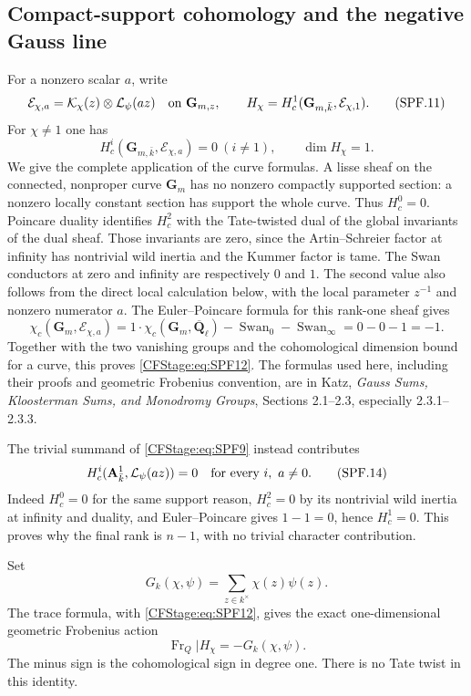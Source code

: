 \subsection{Compact-support cohomology and the negative Gauss line}

For a nonzero scalar \(a\), write
\[
 \mathcal E_{\chi,a}=
       \mathcal K_\chi(z)\otimes\mathcal L_\psi(az)
       \quad\hbox{on }\mathbf G_{m,z},\qquad
 H_\chi=H_c^1(\mathbf G_{m,\bar k},\mathcal E_{\chi,1}).
 \tag{SPF.11}\label{CFStage:eq:SPF11}
\]
For \(\chi\ne1\) one has
\[
 H_c^i(\mathbf G_{m,\bar k},\mathcal E_{\chi,a})=0
       \ (i\ne1),\qquad
 \dim H_\chi=1.
 \tag{SPF.12}\label{CFStage:eq:SPF12}
\]
We give the complete application of the curve formulas. A lisse
sheaf on the connected, nonproper curve \(\mathbf G_m\) has no
nonzero compactly supported section: a nonzero locally constant
section has support the whole curve. Thus \(H_c^0=0\).
Poincare duality identifies \(H_c^2\) with the Tate-twisted dual
of the global invariants of the dual sheaf. Those invariants
are zero, since the Artin--Schreier factor at infinity has
nontrivial wild inertia and the Kummer factor is tame.
The Swan conductors at zero and infinity are respectively \(0\)
and \(1\). The second value also follows from the direct local
calculation below, with the local parameter \(z^{-1}\) and
nonzero numerator \(a\). The Euler--Poincare formula for this
rank-one sheaf gives
\[
 \chi_c(\mathbf G_m,\mathcal E_{\chi,a})
  =1\cdot\chi_c(\mathbf G_m,\overline{\mathbf Q}_\ell)
        -\operatorname{Swan}_0-\operatorname{Swan}_\infty
  =0-0-1=-1.
 \tag{SPF.13}\label{CFStage:eq:SPF13}
\]
Together with the two vanishing groups and the cohomological
dimension bound for a curve, this proves \eqref{CFStage:eq:SPF12}.
The formulas used here, including their proofs and geometric
Frobenius convention, are in Katz,
\emph{Gauss Sums, Kloosterman Sums, and Monodromy Groups},
Sections 2.1--2.3, especially 2.3.1--2.3.3.

The trivial summand of \eqref{CFStage:eq:SPF9} instead contributes
\[
 H_c^i(\mathbf A^1_{\bar k},\mathcal L_\psi(az))=0
                       \quad\hbox{for every }i,\ a\ne0.
 \tag{SPF.14}\label{CFStage:eq:SPF14}
\]
Indeed \(H_c^0=0\) for the same support reason, \(H_c^2=0\)
by its nontrivial wild inertia at infinity and duality, and
Euler--Poincare gives \(1-1=0\), hence \(H_c^1=0\).
This proves why the final rank is \(n-1\), with no trivial
character contribution.

Set
\[
 G_k(\chi,\psi)=\sum_{z\in k^\times}\chi(z)\psi(z).
 \tag{SPF.15}\label{CFStage:eq:SPF15}
\]
The trace formula, with \eqref{CFStage:eq:SPF12}, gives the exact
one-dimensional geometric Frobenius action
\[
 \operatorname{Fr}_Q\big|H_\chi
       =-G_k(\chi,\psi).
 \tag{SPF.16}\label{CFStage:eq:SPF16}
\]
The minus sign is the cohomological sign in degree one.
There is no Tate twist in this identity.


